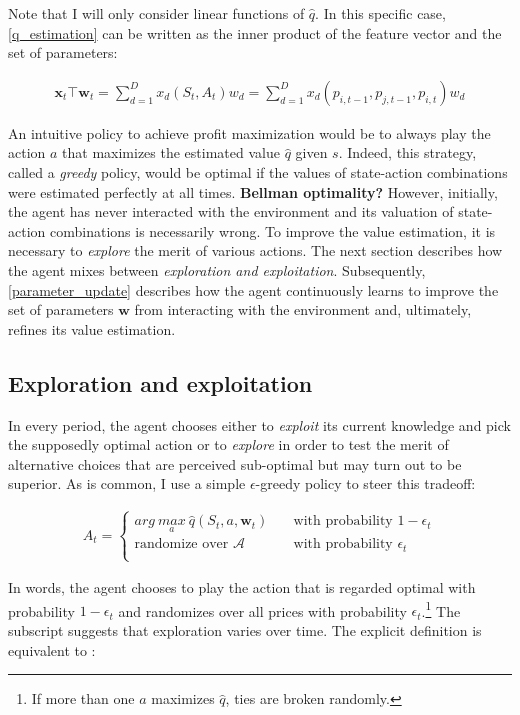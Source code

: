 Note that I will only consider linear functions of $\hat{q}$. In this specific case, \autoref{q_estimation} can be written as the inner product of the feature vector and the set of parameters:

\begin{gather}\label{q_estimation_linear}
\boldsymbol{x}_t \top \boldsymbol{w}_t = \sum_{d=1}^{D} x_d(S_t, A_t) w_d = \sum_{d=1}^{D} x_d(p_{i, t-1}, p_{j, t-1}, p_{i, t}) w_d
\end{gather}

An intuitive policy to achieve profit maximization would be to always play the action $a$ that maximizes the estimated value $\hat{q}$ given $s$. Indeed, this strategy, called a \emph{greedy} policy, would be optimal if the values of state-action combinations were estimated perfectly at all times. \textbf{Bellman optimality?} However, initially, the agent has never interacted with the environment and its valuation of state-action combinations is necessarily wrong. To improve the value estimation, it is necessary to \emph{explore} the merit of various actions. The next section describes how the agent mixes between \emph{exploration and exploitation}. Subsequently, \autoref{parameter_update} describes how the agent continuously learns to improve the set of parameters $\boldsymbol{w}$ from interacting with the environment and, ultimately, refines its value estimation.

\subsection{Exploration and exploitation} 
In every period, the agent chooses either to \emph{exploit} its current knowledge and pick the supposedly optimal action or to \emph{explore} in order to test the merit of alternative choices that are perceived sub-optimal but may turn out to be superior. As is common, I use a simple $\epsilon$-greedy policy to steer this tradeoff:

\begin{gather}\label{action_selection}
 A_t = \begin{cases} arg ~\underset{a}{max} ~ \hat{q}(S_t,a,\boldsymbol{w}_t) & \quad \text{with probability } 1 - \epsilon_t\\
\text{randomize over } \mathcal{A} & \quad \text{with probability } \epsilon_t\\ \end{cases} 
\end{gather}

In words, the agent chooses to play the action that is regarded optimal with probability $1-\epsilon_t$ and randomizes over all prices with probability $\epsilon_t$.\footnote{If more than one $a$ maximizes $\hat{q}$, ties are broken randomly.} The subscript suggests that exploration varies over time. The explicit definition is equivalent to \textcite{calvano_algorithmic_2018}:

